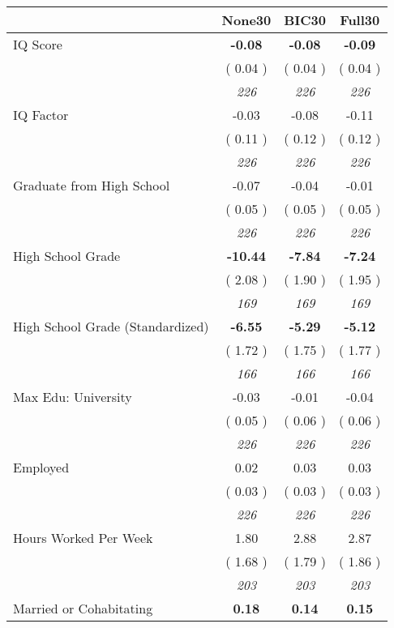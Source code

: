 \begin{tabular}{l c c c}
\toprule
 & None30 & BIC30 & Full30 \\
\midrule
IQ Score & \textbf{     -0.08 } & \textbf{     -0.08 } & \textbf{     -0.09 } \\
& (     0.04 ) & (     0.04 ) & (     0.04 ) \\
& \textit{ 226 } & \textit{ 226 } & \textit{ 226 } \\
IQ Factor &     -0.03 &     -0.08 &     -0.11 \\
& (     0.11 ) & (     0.12 ) & (     0.12 ) \\
& \textit{ 226 } & \textit{ 226 } & \textit{ 226 } \\
Graduate from High School &     -0.07 &     -0.04 &     -0.01 \\
& (     0.05 ) & (     0.05 ) & (     0.05 ) \\
& \textit{ 226 } & \textit{ 226 } & \textit{ 226 } \\
High School Grade & \textbf{    -10.44 } & \textbf{     -7.84 } & \textbf{     -7.24 } \\
& (     2.08 ) & (     1.90 ) & (     1.95 ) \\
& \textit{ 169 } & \textit{ 169 } & \textit{ 169 } \\
High School Grade (Standardized) & \textbf{     -6.55 } & \textbf{     -5.29 } & \textbf{     -5.12 } \\
& (     1.72 ) & (     1.75 ) & (     1.77 ) \\
& \textit{ 166 } & \textit{ 166 } & \textit{ 166 } \\
Max Edu: University &     -0.03 &     -0.01 &     -0.04 \\
& (     0.05 ) & (     0.06 ) & (     0.06 ) \\
& \textit{ 226 } & \textit{ 226 } & \textit{ 226 } \\
Employed &      0.02 &      0.03 &      0.03 \\
& (     0.03 ) & (     0.03 ) & (     0.03 ) \\
& \textit{ 226 } & \textit{ 226 } & \textit{ 226 } \\
Hours Worked Per Week &      1.80 &      2.88 &      2.87 \\
& (     1.68 ) & (     1.79 ) & (     1.86 ) \\
& \textit{ 203 } & \textit{ 203 } & \textit{ 203 } \\
Married or Cohabitating & \textbf{      0.18 } & \textbf{      0.14 } & \textbf{      0.15 } \\

\end{tabular}
